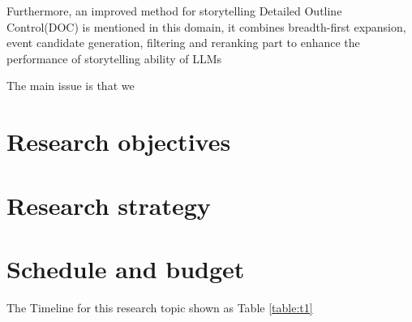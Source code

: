 \documentclass[10pt]{article}
\begin{document}
\begin{multicols}{2}
Furthermore, an improved method for storytelling Detailed Outline Control(DOC) is mentioned in this domain, it combines breadth-first expansion, event candidate generation, filtering and reranking part to enhance the performance of storytelling ability of LLMs\cite{yang-etal-2023-doc}

The main issue is that we 

\section{Research objectives} 

	
\section{Research strategy}


\section{Schedule and budget}

The Timeline for this research topic shown as Table \ref{table:t1}


\end{multicols}
\end{document}
